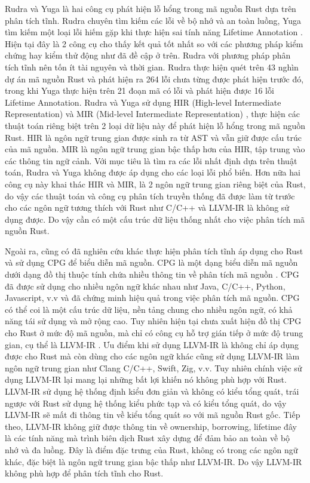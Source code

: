 Rudra và Yuga là hai công cụ phát hiện lỗ hổng trong mã nguồn Rust dựa trên phân tích tĩnh.
Rudra chuyên tìm kiếm các lỗi về bộ nhớ và an toàn luồng, Yuga tìm kiếm một loại lỗi hiếm gặp khi thực hiện sai tính năng Lifetime Annotation \cite{nitin2024uga}.
Hiện tại đây là 2 công cụ cho thấy kết quả tốt nhất so với các phương pháp kiểm chứng hay kiểm thử động như đã đề cập ở trên.
Rudra với phương pháp phân tích tĩnh nên tốn ít tài nguyên và thời gian.
Rudra thực hiện quét trên 43 nghìn dự án mã nguồn Rust và phát hiện ra 264 lỗi chưa từng được phát hiện trước đó, trong khi Yuga thực hiện trên 21 đoạn mã có lỗi và phát hiện được 16 lỗi Lifetime Annotation.
Rudra và Yuga sử dụng HIR (High-level Intermediate Representation) \cite{rustlangHighlevelRust} và MIR (Mid-level Intermediate Representation) \cite{rustlangMidlevelRust}, thực hiện các thuật toán riêng biệt trên 2 loại dữ liệu này để phát hiện lỗ hổng trong mã nguồn Rust.
HIR là ngôn ngữ trung gian được sinh ra từ AST và vẫn giữ được cấu trúc của mã nguồn.
MIR là ngôn ngữ trung gian bậc thấp hơn của HIR, tập trung vào các thông tin ngữ cảnh.
Với mục tiêu là tìm ra các lỗi nhất định dựa trên thuật toán, Rudra và Yuga không được áp dụng cho các loại lỗi phổ biến.
Hơn nữa hai công cụ này khai thác HIR và MIR, là 2 ngôn ngữ trung gian riêng biệt của Rust, do vậy các thuật toán và công cụ phân tích truyền thống đã được làm từ trước cho các ngôn ngữ tương thích với Rust như C/C++ và LLVM-IR là không sử dụng được.
Do vậy cần có một cấu trúc dữ liệu thống nhất cho việc phân tích mã nguồn Rust.

Ngoài ra, cũng có đã nghiên cứu khác thực hiện phân tích tĩnh áp dụng cho Rust và sử dụng CPG để biểu diễn mã nguồn.
CPG là một dạng biểu diễn mã nguồn dưới dạng đồ thị thuộc tính chứa nhiều thông tin về phân tích mã nguồn \cite{yamaguchi2014modeling}.
CPG đã được sử dụng cho nhiều ngôn ngữ khác nhau như Java, C/C++, Python, Javascript, v.v và đã chứng minh hiệu quả trong việc phân tích mã nguồn.
CPG có thể coi là một cấu trúc dữ liệu, nền tảng chung cho nhiều ngôn ngữ, có khả năng tái sử dụng và mở rộng cao.
Tuy nhiên hiện tại chưa xuất hiện đồ thị CPG cho Rust ở mức độ mã nguồn, mà chỉ có công cụ hỗ trợ gián tiếp ở mức độ trung gian, cụ thể là LLVM-IR \cite{kuchler2022representing}.
Ưu điểm khi sử dụng LLVM-IR \cite{lattner2004llvm} là không chỉ áp dụng được cho Rust mà còn dùng cho các ngôn ngữ khác cũng sử dụng LLVM-IR làm ngôn ngữ trung gian như Clang C/C++, Swift, Zig, v.v.
Tuy nhiên chính việc sử dụng LLVM-IR lại mang lại những bất lợi khiến nó không phù hợp với Rust.
LLVM-IR sử dụng hệ thống định kiểu đơn giản và không có kiểu tổng quát, trái ngược với Rust sử dụng hệ thống kiểu phức tạp và có kiểu tổng quát, do vậy LLVM-IR sẽ mất đi thông tin về kiểu tổng quát so với mã nguồn Rust gốc.
Tiếp theo, LLVM-IR không giữ được thông tin về ownership, borrowing, lifetime đây là các tính năng mà trình biên dịch Rust xây dựng để đảm bảo an toàn về bộ nhớ và đa luồng.
Đây là điểm đặc trưng của Rust, không có trong các ngôn ngữ khác, đặc biệt là ngôn ngữ trung gian bậc thấp như LLVM-IR.
Do vậy LLVM-IR không phù hợp để phân tích tĩnh cho Rust.

